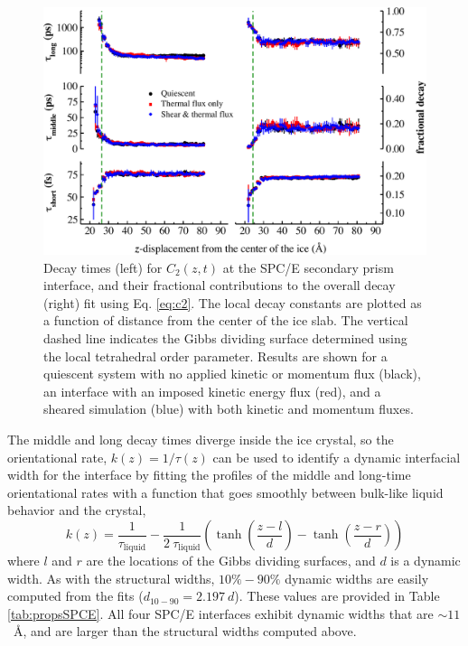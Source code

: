 \newpage
\begin{figure}
\includegraphics[width=\linewidth]{Figures/Sec_lcorrz}
\caption{\label{fig:SPorient} Decay times (left) for $C_2(z,t)$ at the
  SPC/E secondary prism interface, and their fractional contributions to the
  overall decay (right) fit using Eq. \eqref{eq:c2}. The local decay
  constants are plotted as a function of distance from the center of
  the ice slab. The vertical dashed line indicates the Gibbs dividing
  surface determined using the local tetrahedral order parameter.
  Results are shown for a quiescent system with no applied kinetic or
  momentum flux (black), an interface with an imposed
  kinetic energy flux (red), and a sheared simulation (blue) with both
  kinetic and momentum fluxes.}
\end{figure}

The middle and long decay times diverge inside the ice crystal, so the
orientational rate, $k(z) = 1 / \tau(z)$ can be used to identify a
dynamic interfacial width for the interface by fitting the profiles of
the middle and long-time orientational rates with a function that goes
smoothly between bulk-like liquid behavior and the crystal,
\begin{equation}\label{tauFit}
  k(z) = \frac{1}{\tau_\mathrm{liquid}} - \frac{1}{2~\tau_\mathrm{liquid}} \left(
      \tanh \left( \frac{z-l}{d} \right) - \tanh \left( \frac{z-r}{d} \right) \right)
\end{equation}
where $l$ and $r$ are the locations of the Gibbs dividing surfaces,
and $d$ is a dynamic width.  As with the structural widths,
$10\%-90\%$ dynamic widths are easily computed from the fits
($d_\mathrm{10-90} = 2.197~d$).  These values are provided in Table
\ref{tab:propsSPCE}. All four SPC/E interfaces exhibit dynamic widths
that are $\sim 11$~\AA, and are larger than the structural widths
computed above.


